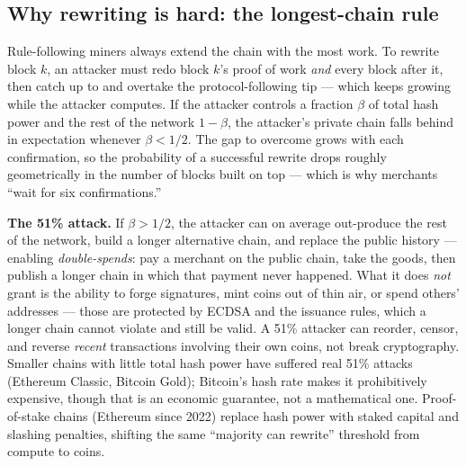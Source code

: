 \subsection{Why rewriting is hard: the longest-chain rule}
\label{ch36:longest}

Rule-following miners always extend the chain with the most work. To rewrite block $k$, an attacker must redo block $k$'s proof of work \emph{and} every block after it, then catch up to and overtake the protocol-following tip --- which keeps growing while the attacker computes. If the attacker controls a fraction $\beta$ of total hash power and the rest of the network $1-\beta$, the attacker's private chain falls behind in expectation whenever $\beta < 1/2$. The gap to overcome grows with each confirmation, so the probability of a successful rewrite drops roughly geometrically in the number of blocks built on top --- which is why merchants ``wait for six confirmations.''

\begin{attackbox}
\textbf{The 51\% attack.} If $\beta > 1/2$, the attacker can on average out-produce the rest of the network, build a longer alternative chain, and replace the public history --- enabling \emph{double-spends}: pay a merchant on the public chain, take the goods, then publish a longer chain in which that payment never happened. What it does \emph{not} grant is the ability to forge signatures, mint coins out of thin air, or spend others' addresses --- those are protected by ECDSA and the issuance rules, which a longer chain cannot violate and still be valid. A 51\% attacker can reorder, censor, and reverse \emph{recent} transactions involving their own coins, not break cryptography. Smaller chains with little total hash power have suffered real 51\% attacks (Ethereum Classic, Bitcoin Gold); Bitcoin's hash rate makes it prohibitively expensive, though that is an economic guarantee, not a mathematical one. Proof-of-stake chains (Ethereum since 2022) replace hash power with staked capital and slashing penalties, shifting the same ``majority can rewrite'' threshold from compute to coins.
\end{attackbox}


